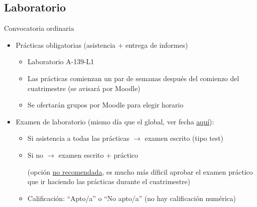 \documentclass[aspectratio=169, usenames,svgnames,dvipsnames]{beamer}
\begin{document}

\subsection*{Laboratorio}

\begin{frame}{Convocatoria ordinaria}

    
    \begin{itemize}
        \item \alert{Prácticas obligatorias} (asistencia $+$ entrega de informes)
        \vspace{1mm}
        \begin{itemize}
            \item 
            {\normalsize Laboratorio A-139-L1}
            \vspace{2mm}
            \item {\normalsize Las prácticas comienzan un par de semanas después del comienzo del cuatrimestre (se avisará por Moodle)}
            \vspace{2mm}
            \item {\normalsize Se ofertarán grupos por Moodle para elegir horario}
            \end{itemize}
        
        \vspace{2.5mm}
        \item \alert{Examen de laboratorio} (mismo día que el global, ver fecha \href{https://www.etsidi.upm.es/Estudiantes/AgendaAcademica/AAFechaExamenes}{aquí}):
        \vspace{1mm}
            \begin{itemize}           
            \item {\normalsize Si \alert{asistencia a todas las prácticas} $\rightarrow$ examen escrito (tipo test)}
            \vspace{2mm}
            \item {\normalsize Si no $\rightarrow$ examen escrito $+$ práctico}

            {\normalsize (opción \underline{no recomendada}, es mucho más díficil aprobar el examen práctico que ir haciendo las prácticas durante el cuatrimestre)}
            \vspace{2mm}
            \item {\normalsize Calificación: ``\alert{Apto/a}'' o ``\alert{No apto/a}'' (no hay calificación numérica)}
            \end{itemize}
        \end{itemize}

\end{frame}
\end{document}
